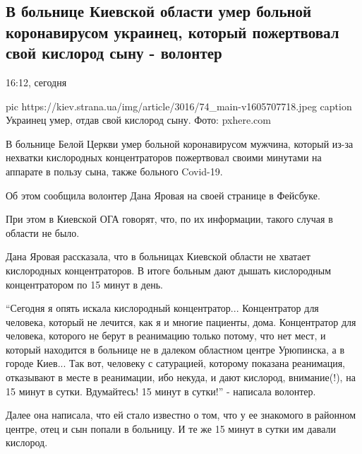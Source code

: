  
 
 

\subsection{В больнице Киевской области умер больной коронавирусом украинец, который пожертвовал свой кислород сыну - волонтер}

16:12, сегодня

\ifcmt
pic https://kiev.strana.ua/img/article/3016/74_main-v1605707718.jpeg
caption Украинец умер, отдав свой кислород сыну. Фото: pxhere.com 
\fi

В больнице Белой Церкви умер больной коронавирусом мужчина, который из-за
нехватки кислородных концентраторов пожертвовал своими минутами на
аппарате в пользу сына, также больного Covid-19.

Об этом сообщила волонтер Дана Яровая на своей странице в Фейсбуке.

При этом в Киевской ОГА говорят, что, по их информации, такого случая в
области не было.

Дана Яровая рассказала, что в больницах Киевской области не хватает
кислородных концентраторов. В итоге больным дают дышать кислородным
концентратором по 15 минут в день.

\enquote{Сегодня я опять искала кислородный концентратор... Концентратор для
человека, который не лечится, как я и многие пациенты, дома. Концентратор
для человека, которого не берут в реанимацию только потому, что нет мест,
и который находится в больнице не в далеком областном центре Урюпинска, а
в городе Киев... Так вот, человеку с сатурацией, которому показана
реанимация, отказывают в месте в реанимации, ибо некуда, и дают кислород,
внимание(!), на 15 минут в сутки. Вдумайтесь! 15 минут в сутки!} -
написала волонтер.

Далее она написала, что ей стало известно о том, что у ее знакомого в
районном центре, отец и сын попали в больницу. И те же 15 минут в сутки им
давали кислород.

